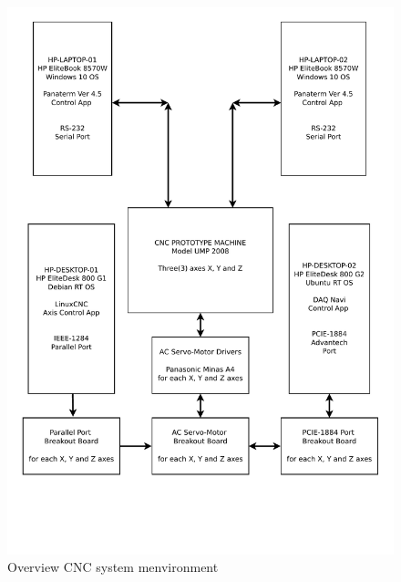 

\clearpage
\pagebreak

\begin{figure}
	\caption{Overview CNC system menvironment}
	\label{Overview-CNC-system-environment.pdf}
	\includegraphics[width=1.00\textwidth]{Chap3/work-setup/Overview-CNC-system-environment.pdf} 
\end{figure}


